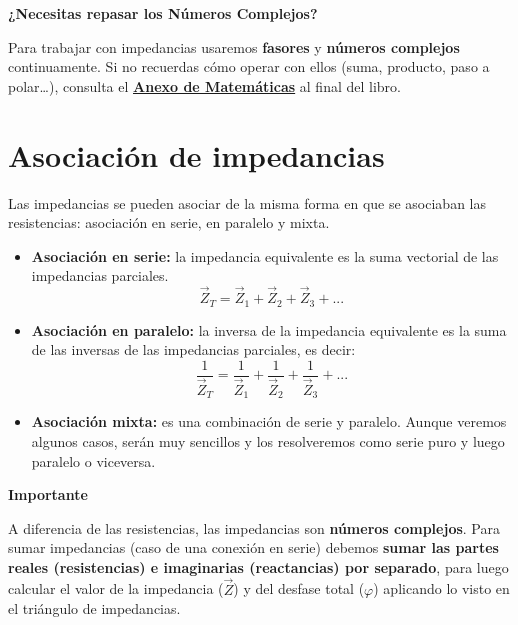 \documentclass[
  a4paper,
  DIV=11,
  numbers=noendperiod]{scrreprt}
\begin{document}
\vspace{1em}

\begin{tcolorbox}[enhanced jigsaw, breakable, colback=white, left=2mm, leftrule=.75mm, rightrule=.15mm, toprule=.15mm, colframe=quarto-callout-tip-color-frame, arc=.35mm, bottomrule=.15mm, opacityback=0]

\vspace{-3mm}\textbf{¿Necesitas repasar los Números Complejos?}\vspace{3mm}

Para trabajar con impedancias usaremos \textbf{fasores} y
\textbf{números complejos} continuamente. Si no recuerdas cómo operar
con ellos (suma, producto, paso a polar\ldots), consulta el
\textbf{\hyperref[sec-anexo-complejos]{Anexo de Matemáticas}} al final
del libro.

\end{tcolorbox}

\section{Asociación de impedancias}\label{asociaciuxf3n-de-impedancias}

Las impedancias se pueden asociar de la misma forma en que se asociaban
las resistencias: asociación en serie, en paralelo y mixta.

\begin{itemize}
\item
  \textbf{Asociación en serie:} la impedancia equivalente es la suma
  vectorial de las impedancias parciales. \[
    \vec{Z}_T=\vec{Z}_1+\vec{Z}_2+\vec{Z}_3+...
    \]
\item
  \textbf{Asociación en paralelo:} la inversa de la impedancia
  equivalente es la suma de las inversas de las impedancias parciales,
  es decir: \[
    \frac{1}{\vec{Z}_T}=\frac{1}{\vec{Z}_1}+\frac{1}{\vec{Z}_2}+\frac{1}{\vec{Z}_3}+...
    \]
\item
  \textbf{Asociación mixta:} es una combinación de serie y paralelo.
  Aunque veremos algunos casos, serán muy sencillos y los resolveremos
  como serie puro y luego paralelo o viceversa.
\end{itemize}

\begin{tcolorbox}[enhanced jigsaw, breakable, colback=white, left=2mm, leftrule=.75mm, rightrule=.15mm, toprule=.15mm, colframe=quarto-callout-warning-color-frame, arc=.35mm, bottomrule=.15mm, opacityback=0]

\vspace{-3mm}\textbf{Importante}\vspace{3mm}

A diferencia de las resistencias, las impedancias son \textbf{números
complejos}. Para sumar impedancias (caso de una conexión en serie)
debemos \textbf{sumar las partes reales (resistencias) e imaginarias
(reactancias) por separado}, para luego calcular el valor de la
impedancia (\(\vec{Z}\)) y del desfase total (\(\varphi\)) aplicando lo
visto en el triángulo de impedancias.

\end{tcolorbox}
\end{document}

